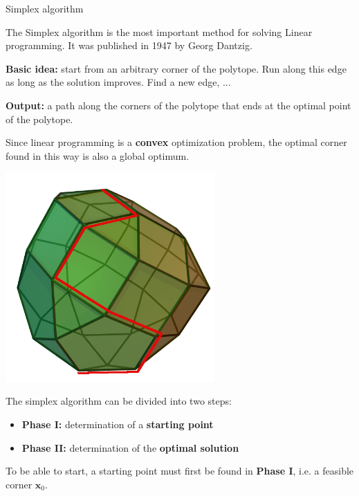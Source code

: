 \begin{vbframe}{Simplex algorithm}

The Simplex algorithm is the most important method for solving Linear programming. It was published in 1947 by Georg Dantzig.

\lz

\textbf{Basic idea:} start from an arbitrary corner of the polytope. Run along this edge as long as the solution improves. Find a new edge, ...

\lz

\textbf{Output:} a path along the corners of the polytope that ends at the optimal point of the polytope.

\lz

Since linear programming is a \textbf{convex} optimization problem, the optimal corner found in this way is also a global optimum.

\framebreak

\begin{center}
\includegraphics[width = 0.6\textwidth]{figure_man/simplex.png}
\end{center}

\framebreak

The simplex algorithm can be divided into two steps:

\begin{itemize}
\item \textbf{Phase I:} determination of a \textbf{starting point}
\item \textbf{Phase II:} determination of the \textbf{optimal solution}
\end{itemize}

To be able to start, a starting point must first be found in \textbf{Phase I}, i.e. a feasible corner $\bm{x}_0$.


\end{vbframe}
